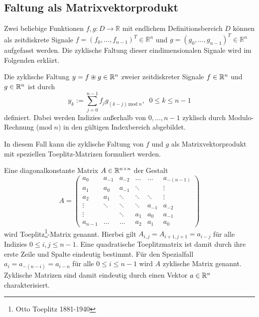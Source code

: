 

\subsection{Faltung als Matrixvektorprodukt}
\label{abs:conv_using_sparse}
Zwei beliebige Funktionen $f,g: D \rightarrow \mathbb{R}$ mit endlichem Definitionsbereich $D$ können als zeitdiskrete Signale $f=(f_0, \ldots, f_{n-1})^T \in \mathbb{R}^{n}$ und $g=(g_0, \ldots, g_{n-1})^T \in \mathbb{R}^{n}$ aufgefasst werden. %
Die zyklische Faltung dieser eindimensionalen Signale wird im Folgenden erklärt.

\begin{defi}
    \label{def:cycconv}
    Die zyklische Faltung $y=f \circledast g \in \mathbb{R}^{n}$ zweier zeitdiskreter Signale $f \in \mathbb{R}^n$ und $g \in \mathbb{R}^n$ ist durch
    \begin{equation*}
        y_k:=\sum_{j=0}^{n-1} f_j g_{(k-j) \, \mathrm{mod} \; n},  \; \; 0 \leq k \leq n-1
    \end{equation*}
    definiert. Dabei werden Indizies außerhalb von $0, \ldots, n-1$ zyklisch durch Modulo-Rechnung ($\mathrm{mod} \; n)$ in den gültigen Indexbereich abgebildet.
\end{defi}
In diesem Fall kann die zyklische Faltung von $f$ und $g$ als Matrixvektorprodukt mit speziellen Toeplitz-Matrizen formuliert werden. 

\begin{defi}
    \label{def:toeplitzM}
    Eine diagonalkonstante Matrix $A \in \mathbb{R}^{n \times n}$ der Gestalt
    \begin{equation*}
    A=
    \begin{pmatrix}
        a_0 & a_{-1} &a_{-2} &\ldots &\ldots &a_{-(n-1)} \\ 
        a_1 & a_0 &a_{-1} &\ddots & &\vdots \\
        a_2 & a_1 &\ddots &\ddots &\ddots &\vdots\\
        \vdots & \ddots &\ddots &\ddots &a_{-1} &a_{-2}\\
        \vdots & &\ddots &a_1 &a_0 &a_{-1} \\
        a_{n-1} &\ldots &\ldots &a_{2} &a_{1} &a_0
    \end{pmatrix}
\end{equation*}
    wird Toeplitz\footnote{Otto Toeplitz 1881-1940}-Matrix genannt. Hierbei gilt $A_{i,j}=A_{i+1,j+1}=a_{i-j}$ für alle Indizies $0 \leq i, j \leq n-1$. Eine quadratische Toeplitzmatrix ist damit durch ihre erste Zeile und Spalte eindeutig bestimmt. Für den Spezialfall $a_i=a_{-(n-i)}=a_{i-n}$ für alle $0 \leq i \leq n-1$ wird $A$ zyklische Matrix genannt. Zyklische Matrizen sind damit eindeutig durch einen Vektor $a \in \mathbb{R}^n$ charakterisiert.
\end{defi}

